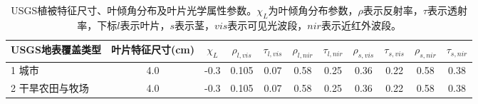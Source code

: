 \begin{landscape}
\begin{table}[htbp]
\centering
\caption{USGS植被特征尺寸、叶倾角分布及叶片光学属性参数。$\chi_L$为叶倾角分布参数，$\rho$表示反射率，$\tau$表示透射率，下标$l$表示叶片，$s$表示茎，$vis$表示可见光波段，$nir$表示近红外波段。}
\label{tab:USGS植被特征尺寸叶倾角分布及叶片光学属性参数1}
    \begin{tabular}{@{}lcccccccccc@{}}
    \toprule
    USGS地表覆盖类型     & 叶片特征尺寸(cm) & $\chi_L$ &$\rho_{l, vis}$ & $\tau_{l, vis}$  &$\rho_{l, nir}$ &$\tau_{l, nir}$ & $\rho_{s, vis}$ &$\tau_{s, vis}$ &$\rho_{s, nir}$ &$\tau_{s,nir}$\\ \midrule
    1 城市           & 4.0        & -0.3                                                                         & 0.105                                                                                                           & 0.07                                                                                                            & 0.58                                                                                                            & 0.25                                                                                                            & 0.36                                                                                                            & 0.22                                                                                                            & 0.58                                                                                                            & 0.38                                                                                                            \\
    2 干旱农田与牧场      & 4.0        & -0.3                                                                         & 0.105                                                                                                           & 0.07                                                                                                            & 0.58                                                                                                            & 0.25                                                                                                            & 0.36                                                                                                            & 0.22                                                                                                            & 0.58                                                                                                            & 0.38                                                                                                            \\

\end{tabular}
\end{table}
\end{landscape}
